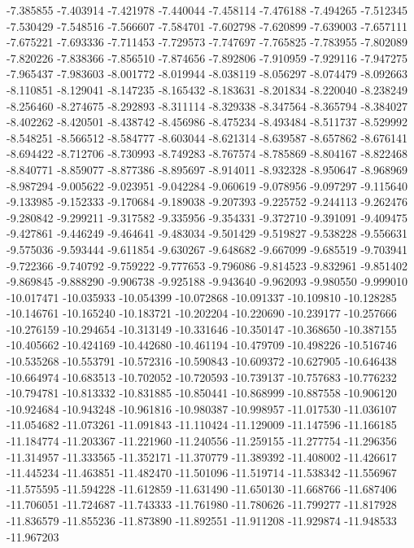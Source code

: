 -7.385855
-7.403914
-7.421978
-7.440044
-7.458114
-7.476188
-7.494265
-7.512345
-7.530429
-7.548516
-7.566607
-7.584701
-7.602798
-7.620899
-7.639003
-7.657111
-7.675221
-7.693336
-7.711453
-7.729573
-7.747697
-7.765825
-7.783955
-7.802089
-7.820226
-7.838366
-7.856510
-7.874656
-7.892806
-7.910959
-7.929116
-7.947275
-7.965437
-7.983603
-8.001772
-8.019944
-8.038119
-8.056297
-8.074479
-8.092663
-8.110851
-8.129041
-8.147235
-8.165432
-8.183631
-8.201834
-8.220040
-8.238249
-8.256460
-8.274675
-8.292893
-8.311114
-8.329338
-8.347564
-8.365794
-8.384027
-8.402262
-8.420501
-8.438742
-8.456986
-8.475234
-8.493484
-8.511737
-8.529992
-8.548251
-8.566512
-8.584777
-8.603044
-8.621314
-8.639587
-8.657862
-8.676141
-8.694422
-8.712706
-8.730993
-8.749283
-8.767574
-8.785869
-8.804167
-8.822468
-8.840771
-8.859077
-8.877386
-8.895697
-8.914011
-8.932328
-8.950647
-8.968969
-8.987294
-9.005622
-9.023951
-9.042284
-9.060619
-9.078956
-9.097297
-9.115640
-9.133985
-9.152333
-9.170684
-9.189038
-9.207393
-9.225752
-9.244113
-9.262476
-9.280842
-9.299211
-9.317582
-9.335956
-9.354331
-9.372710
-9.391091
-9.409475
-9.427861
-9.446249
-9.464641
-9.483034
-9.501429
-9.519827
-9.538228
-9.556631
-9.575036
-9.593444
-9.611854
-9.630267
-9.648682
-9.667099
-9.685519
-9.703941
-9.722366
-9.740792
-9.759222
-9.777653
-9.796086
-9.814523
-9.832961
-9.851402
-9.869845
-9.888290
-9.906738
-9.925188
-9.943640
-9.962093
-9.980550
-9.999010
-10.017471
-10.035933
-10.054399
-10.072868
-10.091337
-10.109810
-10.128285
-10.146761
-10.165240
-10.183721
-10.202204
-10.220690
-10.239177
-10.257666
-10.276159
-10.294654
-10.313149
-10.331646
-10.350147
-10.368650
-10.387155
-10.405662
-10.424169
-10.442680
-10.461194
-10.479709
-10.498226
-10.516746
-10.535268
-10.553791
-10.572316
-10.590843
-10.609372
-10.627905
-10.646438
-10.664974
-10.683513
-10.702052
-10.720593
-10.739137
-10.757683
-10.776232
-10.794781
-10.813332
-10.831885
-10.850441
-10.868999
-10.887558
-10.906120
-10.924684
-10.943248
-10.961816
-10.980387
-10.998957
-11.017530
-11.036107
-11.054682
-11.073261
-11.091843
-11.110424
-11.129009
-11.147596
-11.166185
-11.184774
-11.203367
-11.221960
-11.240556
-11.259155
-11.277754
-11.296356
-11.314957
-11.333565
-11.352171
-11.370779
-11.389392
-11.408002
-11.426617
-11.445234
-11.463851
-11.482470
-11.501096
-11.519714
-11.538342
-11.556967
-11.575595
-11.594228
-11.612859
-11.631490
-11.650130
-11.668766
-11.687406
-11.706051
-11.724687
-11.743333
-11.761980
-11.780626
-11.799277
-11.817928
-11.836579
-11.855236
-11.873890
-11.892551
-11.911208
-11.929874
-11.948533
-11.967203
